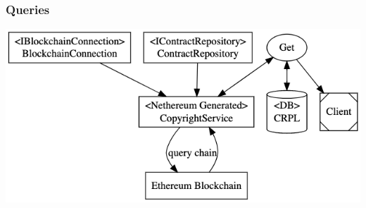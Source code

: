 \documentclass[12pt]{article}
\begin{document}
\subsubsection{Queries}
\includegraphics[width=\textwidth,height=\textheight,keepaspectratio]{images/operational/chain-inject}
\end{document}
